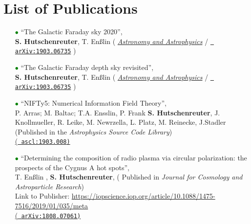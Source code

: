 \documentclass[11pt,a4paper,sans, table, dvipsnames]{moderncv}        %
\begin{document}
\section{List of Publications}
\begin{itemize}

\vspace{6pt}

\item[\textcolor{Green}{$\bullet$}]{``The Galactic Faraday sky 2020'', \\  
\textbf{S. Hutschenreuter}, T. En{\ss}lin ({\color{blue} \href{https://www.aanda.org/articles/aa/full_html/2020/01/aa35479-19/aa35479-19.html}{\textit{Astronomy and Astrophysics}} /  \href{https://arxiv.org/abs/1903.06735}{\texttt{{\color{blue} arXiv:1903.06735}}}} })

\item[\textcolor{Green}{$\bullet$}]{``The Galactic Faraday depth sky revisited'', \\  
\textbf{S. Hutschenreuter}, T. En{\ss}lin ({\color{blue} \href{https://www.aanda.org/articles/aa/full_html/2020/01/aa35479-19/aa35479-19.html}{\textit{Astronomy and Astrophysics}} /  \href{https://arxiv.org/abs/1903.06735}{\texttt{{\color{blue} arXiv:1903.06735}}}} })

\vspace{6pt}

\item[\textcolor{Green}{$\bullet$}]{``NIFTy5: Numerical Information Field Theory'', \\P. Arras; M. Baltac; T.A. Ensslin, P. Frank \textbf{S. Hutschenreuter}, J. Knollmueller, R. Leike, M. Newrzella, L. Platz, M. Reinecke, J.Stadler ({\color{blue}Published in the \textit{Astrophysics Source Code Library}})\\ \href{http://ascl.net/1903.008}{(\texttt{{\color{blue} ascl:1903.008})}}}

\vspace{6pt}

\item[\textcolor{Green}{$\bullet$}]{``Determining the composition of radio plasma via circular polarization: the prospects of the Cygnus A hot spots'', \\ 
T. En{\ss}lin , \textbf{S. Hutschenreuter},  ({\color{blue} Published in \textit{Journal for Cosmology and Astroparticle Research}}) \\ Link to Publisher: \url{https://iopscience.iop.org/article/10.1088/1475-7516/2019/01/035/meta} \\
\href{https://arxiv.org/abs/1808.07061}{(\texttt{{\color{blue} arXiv:1808.07061})}}}


\end{itemize}
\end{document}
